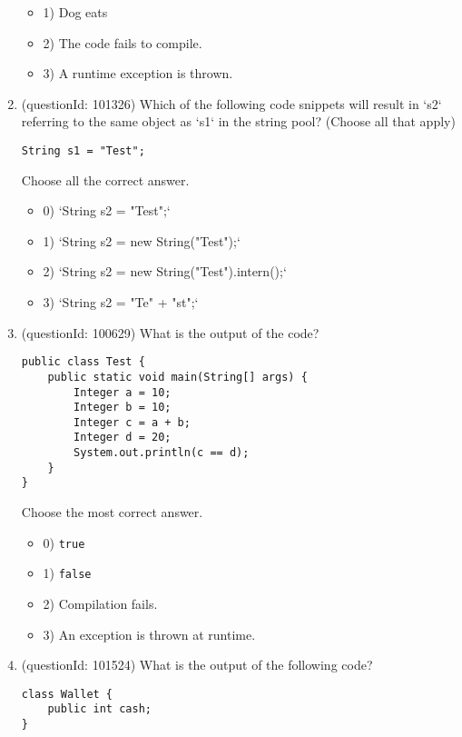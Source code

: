 \documentclass[12pt]{article}
\begin{document}
\begin{enumerate}[label=(\arabic*)]
\begin{itemize}
\item 1) Dog eats

\item 2) The code fails to compile.

\item 3) A runtime exception is thrown.

\end{itemize}
\item (questionId: 101326) Which of the following code snippets will result in `s2` referring to the same object as `s1` in the string pool? (Choose all that apply)
\begin{verbatim}
String s1 = "Test";
\end{verbatim}
Choose all the correct answer.\begin{itemize}
\item 0) `String s2 = "Test";`

\item 1) `String s2 = new String("Test");`

\item 2) `String s2 = new String("Test").intern();`

\item 3) `String s2 = "Te" + "st";`

\end{itemize}
\item (questionId: 100629) What is the output of the code?\n\begin{verbatim}
public class Test {
    public static void main(String[] args) {
        Integer a = 10;
        Integer b = 10;
        Integer c = a + b;
        Integer d = 20;
        System.out.println(c == d);
    }
}
\end{verbatim}
Choose the most correct answer. 
\begin{itemize}
\item 0) \verb|true|

\item 1) \verb|false|

\item 2) Compilation fails.

\item 3) An exception is thrown at runtime.

\end{itemize}
\item (questionId: 101524) What is the output of the following code?\n\begin{verbatim}
class Wallet {
    public int cash;
}


\end{verbatim}
\end{enumerate}
\end{document}
